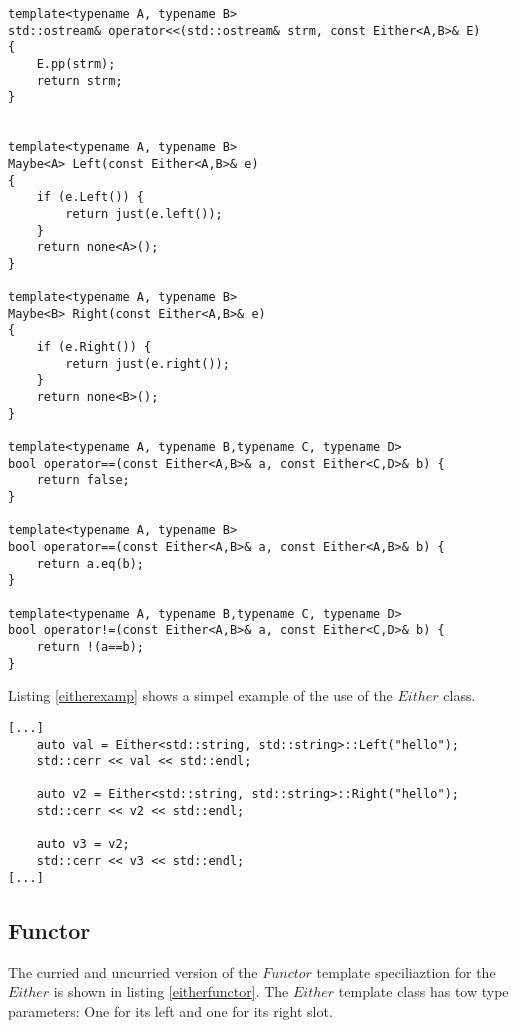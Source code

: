 \documentclass[12pt,fleqn]{article}
\begin{document}
%
%
%
\begin{minipage}{\linewidth}
\begin{lstlisting}[caption=Auxilliary functions for the Either type class, label=eitheraux]
template<typename A, typename B>
std::ostream& operator<<(std::ostream& strm, const Either<A,B>& E) 
{
	E.pp(strm);
	return strm;
}


template<typename A, typename B>
Maybe<A> Left(const Either<A,B>& e)
{
	if (e.Left()) {
		return just(e.left());
	}
	return none<A>();
}

template<typename A, typename B>
Maybe<B> Right(const Either<A,B>& e)
{
	if (e.Right()) {
		return just(e.right());
	}
	return none<B>();
}

template<typename A, typename B,typename C, typename D>
bool operator==(const Either<A,B>& a, const Either<C,D>& b) {
	return false;
}

template<typename A, typename B> 
bool operator==(const Either<A,B>& a, const Either<A,B>& b) {
	return a.eq(b);
}

template<typename A, typename B,typename C, typename D>
bool operator!=(const Either<A,B>& a, const Either<C,D>& b) {
	return !(a==b);
}

\end{lstlisting}
\end{minipage}
%
%
%
%

Listing \ref{eitherexamp} shows a simpel example of the use of the $Either$ class.

%
%
\begin{minipage}{\linewidth}
\begin{lstlisting}[caption=Example of the use of Either,label=eitherexamp]
[...]	
	auto val = Either<std::string, std::string>::Left("hello");
	std::cerr << val << std::endl;

	auto v2 = Either<std::string, std::string>::Right("hello");
	std::cerr << v2 << std::endl;

	auto v3 = v2;
	std::cerr << v3 << std::endl;
[...]
\end{lstlisting}
\end{minipage}
%
%
%


\subsection{Functor}
%

The curried and uncurried version of the $Functor$ template speciliaztion for the $Either$ is shown in listing \ref{eitherfunctor}.
The $Either$ template class has tow type parameters: One for its left and one for its right slot.
\end{document}
